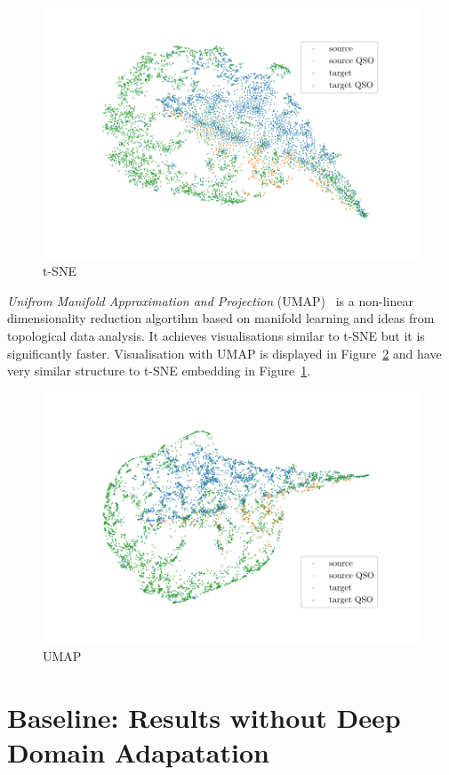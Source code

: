 \begin{figure}
	\includegraphics[width=\textwidth]{img/tsne.pdf}
	\caption{t-SNE}
	\label{tsne}
\end{figure}

\textit{Unifrom Manifold Approximation and Projection} (UMAP)~\cite{mcinnes2018}
is a non-linear dimensionality reduction algortihm based on manifold learning and ideas from topological data analysis.
It achieves visualisations similar to t-SNE but it is significantly faster.
Visualisation with UMAP is displayed in Figure~\ref{umap}
and have very similar structure to t-SNE embedding in Figure~\ref{tsne}.

\begin{figure}
	\includegraphics[width=\textwidth]{img/umap.pdf}
	\caption{UMAP}
	\label{umap}
\end{figure}

\section{Baseline: Results without Deep Domain Adapatation}
\label{baseline}


